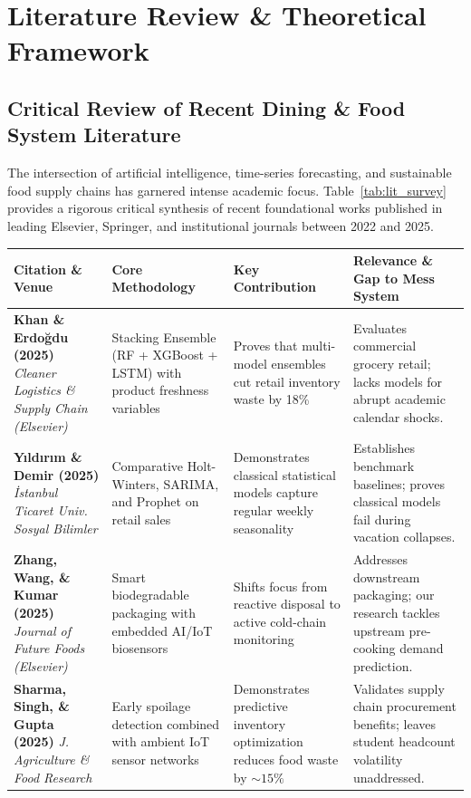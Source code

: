 \documentclass[11pt,a4paper,oneside]{report}
\begin{document}
\chapter{Literature Review \& Theoretical Framework}

\section{Critical Review of Recent Dining \& Food System Literature}
The intersection of artificial intelligence, time-series forecasting, and sustainable food supply chains has garnered intense academic focus. Table~\ref{tab:lit_survey} provides a rigorous critical synthesis of recent foundational works published in leading Elsevier, Springer, and institutional journals between 2022 and 2025.

\begin{table}[ht]
\centering
\small
\renewcommand{\arraystretch}{1.3}
\begin{tabularx}{\textwidth}{p{3.2cm}p{3.2cm}p{4.2cm}X}
\toprule
\rowcolor{bluelight}
\textbf{Citation \& Venue} & \textbf{Core Methodology} & \textbf{Key Contribution} & \textbf{Relevance \& Gap to Mess System} \\
\midrule
\textbf{Khan \& Erdo\u{g}du (2025)} \newline \textit{Cleaner Logistics \& Supply Chain (Elsevier)} & Stacking Ensemble (RF + XGBoost + LSTM) with product freshness variables & Proves that multi-model ensembles cut retail inventory waste by 18\% & Evaluates commercial grocery retail; lacks models for abrupt academic calendar shocks. \\
\hline
\textbf{Y{\i}ld{\i}r{\i}m \& Demir (2025)} \newline \textit{\.Istanbul Ticaret Univ. Sosyal Bilimler} & Comparative Holt-Winters, SARIMA, and Prophet on retail sales & Demonstrates classical statistical models capture regular weekly seasonality & Establishes benchmark baselines; proves classical models fail during vacation collapses. \\
\hline
\textbf{Zhang, Wang, \& Kumar (2025)} \newline \textit{Journal of Future Foods (Elsevier)} & Smart biodegradable packaging with embedded AI/IoT biosensors & Shifts focus from reactive disposal to active cold-chain monitoring & Addresses downstream packaging; our research tackles upstream pre-cooking demand prediction. \\
\hline
\textbf{Sharma, Singh, \& Gupta (2025)} \newline \textit{J. Agriculture \& Food Research} & Early spoilage detection combined with ambient IoT sensor networks & Demonstrates predictive inventory optimization reduces food waste by $\sim 15\%$ & Validates supply chain procurement benefits; leaves student headcount volatility unaddressed. \\

\end{tabularx}
\end{table}
\end{document}
